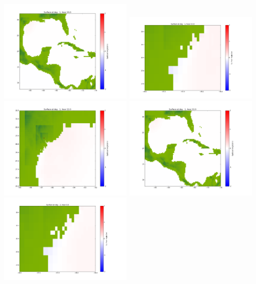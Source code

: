 \documentclass[11pt]{article}
\begin{document}
\vskip 10pt 
\includegraphics[width=0.475\textwidth]{frame0046fig1003.png}
\vskip 10pt 
\includegraphics[width=0.475\textwidth]{frame0047fig1001.png}
\includegraphics[width=0.475\textwidth]{frame0047fig1002.png}
\vskip 10pt 
\includegraphics[width=0.475\textwidth]{frame0047fig1003.png}
\vskip 10pt 
\includegraphics[width=0.475\textwidth]{frame0048fig1001.png}
\end{document}
